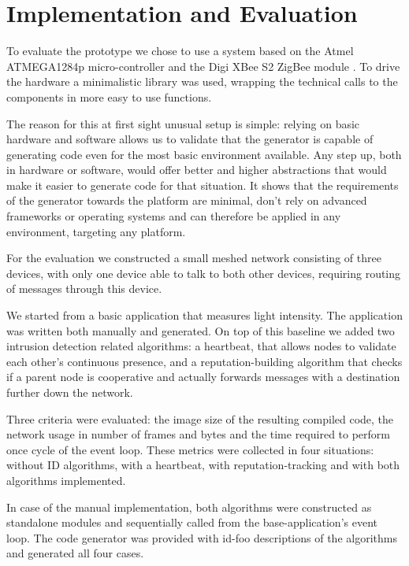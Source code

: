 \documentclass[conference]{IEEEtran}
\newcommand{\NAME}{id-foo\xspace}
\begin{document}
\section{Implementation and Evaluation}
\label{evaluation}

To evaluate the prototype we chose to use a system based on the Atmel
ATMEGA1284p micro-controller \cite{datasheet:atmega1284p} and the Digi XBee S2
ZigBee module \cite{manual:xbee}. To drive the hardware a minimalistic library
was used, wrapping the technical calls to the components in more easy to use
functions.

The reason for this at first sight unusual setup is simple: relying on basic
hardware and software allows us to validate that the generator is capable of
generating code even for the most basic environment available. Any step up,
both in hardware or software, would offer better and higher abstractions that
would make it easier to generate code for that situation. It shows that the
requirements of the generator towards the platform are minimal, don't rely on
advanced frameworks or operating systems and can therefore be applied in any
environment, targeting any platform.

For the evaluation we constructed a small meshed network consisting of three
devices, with only one device able to talk to both other devices, requiring
routing of messages through this device.

We started from a basic application that measures light intensity. The
application was written both manually and generated. On top of this baseline we
added two intrusion detection related algorithms: a heartbeat, that allows
nodes to validate each other's continuous presence, and a reputation-building
algorithm that checks if a parent node is cooperative and actually forwards
messages with a destination further down the
network\cite{ganeriwal2008reputation}.

Three criteria were evaluated: the image size of the resulting compiled code,
the network usage in number of frames and bytes and the time required to
perform once cycle of the event loop. These metrics were collected in four
situations: without ID algorithms, with a heartbeat, with reputation-tracking
and with both algorithms implemented.

In case of the manual implementation, both algorithms were constructed as
standalone modules and sequentially called from the base-application's event
loop. The code generator was provided with \NAME descriptions of the algorithms
and generated all four cases.
\end{document}
